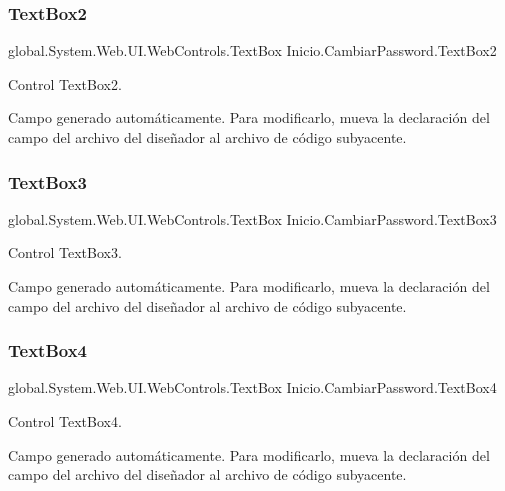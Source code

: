 \subsubsection{\texorpdfstring{TextBox2}{TextBox2}}
{\footnotesize\ttfamily global.\+System.\+Web.\+U\+I.\+Web\+Controls.\+Text\+Box Inicio.\+Cambiar\+Password.\+Text\+Box2\hspace{0.3cm}{\ttfamily [protected]}}



Control Text\+Box2. 

Campo generado automáticamente. Para modificarlo, mueva la declaración del campo del archivo del diseñador al archivo de código subyacente. \mbox{\label{classInicio_1_1CambiarPassword_affa43c3fb9f3daacfb67965c2c50466f}} 
\subsubsection{\texorpdfstring{TextBox3}{TextBox3}}
{\footnotesize\ttfamily global.\+System.\+Web.\+U\+I.\+Web\+Controls.\+Text\+Box Inicio.\+Cambiar\+Password.\+Text\+Box3\hspace{0.3cm}{\ttfamily [protected]}}



Control Text\+Box3. 

Campo generado automáticamente. Para modificarlo, mueva la declaración del campo del archivo del diseñador al archivo de código subyacente. \mbox{\label{classInicio_1_1CambiarPassword_a9365f80de4f65ec031a704d80d0b5c51}} 
\subsubsection{\texorpdfstring{TextBox4}{TextBox4}}
{\footnotesize\ttfamily global.\+System.\+Web.\+U\+I.\+Web\+Controls.\+Text\+Box Inicio.\+Cambiar\+Password.\+Text\+Box4\hspace{0.3cm}{\ttfamily [protected]}}



Control Text\+Box4. 

Campo generado automáticamente. Para modificarlo, mueva la declaración del campo del archivo del diseñador al archivo de código subyacente. \mbox{\label{classInicio_1_1CambiarPassword_a852585bbaa846d9076125c13ca2ad786}} 
